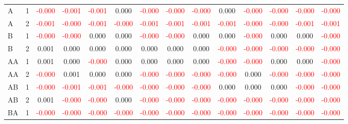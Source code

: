 \begin{table}[!htb]
{\begin{tabular}{llcccccccccccc}
A & 1 & \textcolor{red}{-0.000} & \textcolor{red}{-0.001} & \textcolor{red}{-0.001} & 0.000 & \textcolor{red}{-0.000} & \textcolor{red}{-0.000} & \textcolor{red}{-0.000} & 0.000 & \textcolor{red}{-0.000} & \textcolor{red}{-0.000} & \textcolor{red}{-0.000} & \textcolor{red}{-0.000}\\
A & 2 & \textcolor{red}{-0.001} & \textcolor{red}{-0.000} & \textcolor{red}{-0.001} & \textcolor{red}{-0.000} & \textcolor{red}{-0.001} & \textcolor{red}{-0.001} & \textcolor{red}{-0.001} & \textcolor{red}{-0.001} & \textcolor{red}{-0.000} & \textcolor{red}{-0.000} & \textcolor{red}{-0.001} & \textcolor{red}{-0.001}\\
B & 1 & \textcolor{red}{-0.000} & \textcolor{red}{-0.000} & 0.000 & 0.000 & \textcolor{red}{-0.000} & \textcolor{red}{-0.000} & 0.000 & 0.000 & \textcolor{red}{-0.000} & 0.000 & 0.000 & \textcolor{red}{-0.000}\\
B & 2 & 0.001 & 0.000 & 0.000 & 0.000 & 0.000 & 0.000 & 0.000 & \textcolor{red}{-0.000} & \textcolor{red}{-0.000} & \textcolor{red}{-0.000} & \textcolor{red}{-0.000} & \textcolor{red}{-0.000}\\
AA & 1 & 0.001 & 0.000 & \textcolor{red}{-0.000} & 0.000 & 0.000 & 0.000 & 0.000 & \textcolor{red}{-0.000} & \textcolor{red}{-0.000} & 0.000 & 0.000 & \textcolor{red}{-0.000}\\
AA & 2 & \textcolor{red}{-0.000} & 0.001 & 0.000 & 0.000 & \textcolor{red}{-0.000} & \textcolor{red}{-0.000} & \textcolor{red}{-0.000} & \textcolor{red}{-0.000} & 0.000 & \textcolor{red}{-0.000} & \textcolor{red}{-0.000} & \textcolor{red}{-0.000}\\
AB & 1 & \textcolor{red}{-0.000} & \textcolor{red}{-0.001} & \textcolor{red}{-0.001} & \textcolor{red}{-0.000} & \textcolor{red}{-0.000} & \textcolor{red}{-0.000} & \textcolor{red}{-0.000} & 0.000 & 0.000 & 0.000 & \textcolor{red}{-0.000} & \textcolor{red}{-0.000}\\
AB & 2 & 0.001 & \textcolor{red}{-0.000} & \textcolor{red}{-0.000} & 0.000 & \textcolor{red}{-0.000} & \textcolor{red}{-0.000} & \textcolor{red}{-0.000} & \textcolor{red}{-0.000} & \textcolor{red}{-0.000} & \textcolor{red}{-0.000} & \textcolor{red}{-0.000} & \textcolor{red}{-0.000}\\
BA & 1 & \textcolor{red}{-0.000} & \textcolor{red}{-0.000} & \textcolor{red}{-0.000} & \textcolor{red}{-0.000} & \textcolor{red}{-0.000} & \textcolor{red}{-0.000} & \textcolor{red}{-0.000} & \textcolor{red}{-0.000} & \textcolor{red}{-0.000} & \textcolor{red}{-0.000} & \textcolor{red}{-0.000} & \textcolor{red}{-0.000}\\

\end{tabular}}
\end{table}
